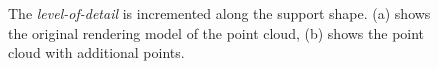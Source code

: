 \begin{figure}
\centering
{}
\caption{The \textit{level-of-detail} is incremented along the support shape. (a) shows the original rendering model of the point cloud, (b) shows the point cloud with additional points. }
\label{fig:technologiezentrum_lod_increment}
\end{figure}




